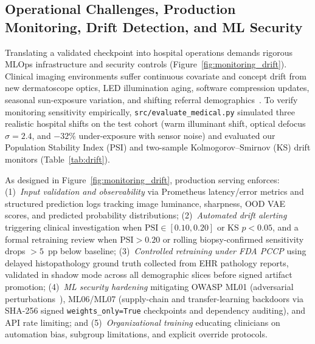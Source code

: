 \subsection{Operational Challenges, Production Monitoring, Drift Detection, and ML Security}
Translating a validated checkpoint into hospital operations demands rigorous MLOps infrastructure and security controls (Figure~\ref{fig:monitoring_drift}). Clinical imaging environments suffer continuous covariate and concept drift from new dermatoscope optics, LED illumination aging, software compression updates, seasonal sun-exposure variation, and shifting referral demographics~\cite{Finlayson2021clinician}. To verify monitoring sensitivity empirically, \texttt{src/evaluate\_medical.py} simulated three realistic hospital shifts on the test cohort (warm illuminant shift, optical defocus $\sigma=2.4$, and $-32\%$ under-exposure with sensor noise) and evaluated our Population Stability Index (PSI) and two-sample Kolmogorov--Smirnov (KS) drift monitors (Table~\ref{tab:drift}).

\begin{table}[htbp]
\centering
\caption{\textbf{Simulated clinical deployment drift monitoring (PSI and KS tests) and automated retraining triggers.}}
\label{tab:drift}
\small

\end{table}



As designed in Figure~\ref{fig:monitoring_drift}, production serving enforces: (1)~\emph{Input validation and observability} via Prometheus latency/error metrics and structured prediction logs tracking image luminance, sharpness, OOD VAE scores, and predicted probability distributions; (2)~\emph{Automated drift alerting} triggering clinical investigation when $\mathrm{PSI} \in [0.10, 0.20]$ or KS $p < 0.05$, and a formal retraining review when $\mathrm{PSI} > 0.20$ or rolling biopsy-confirmed sensitivity drops $>5$~pp below baseline; (3)~\emph{Controlled retraining under FDA PCCP} using delayed histopathology ground truth collected from EHR pathology reports, validated in shadow mode across all demographic slices before signed artifact promotion; (4)~\emph{ML security hardening} mitigating OWASP ML01 (adversarial perturbations~\cite{Finlayson2019adversarial}), ML06/ML07 (supply-chain and transfer-learning backdoors via SHA-256 signed \texttt{weights\_only=True} checkpoints and dependency auditing), and API rate limiting; and (5)~\emph{Organizational training} educating clinicians on automation bias, subgroup limitations, and explicit override protocols.
